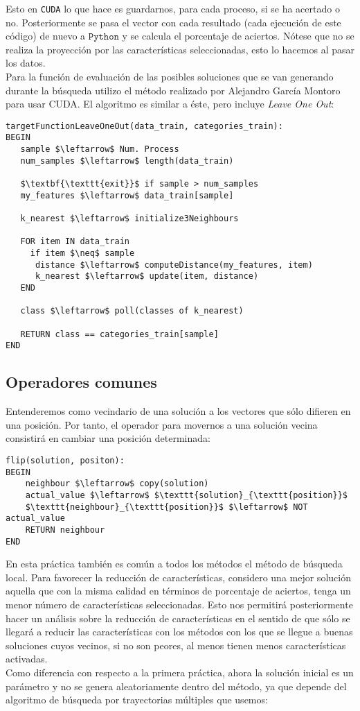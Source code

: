 \documentclass[11pt,leqno]{article}
\begin{document}
	Esto en \texttt{CUDA} lo que hace es guardarnos, para cada proceso, si se ha acertado o no. Posteriormente se pasa el vector con cada resultado (cada ejecución de este código) de nuevo a $\texttt{Python}$ y se calcula el porcentaje de aciertos. Nótese que no se realiza la proyección por las características seleccionadas, esto lo hacemos al pasar los datos.\\
	Para la función de evaluación de las posibles soluciones 	que se van generando durante la búsqueda utilizo el método realizado por Alejandro García Montoro para usar CUDA. El algoritmo es similar a éste, pero incluye \textit{Leave One Out}:

\begin{lstlisting}[mathescape=true]
targetFunctionLeaveOneOut(data_train, categories_train):
BEGIN
   sample $\leftarrow$ Num. Process
   num_samples $\leftarrow$ length(data_train)
   
   $\textbf{\texttt{exit}}$ if sample > num_samples
   my_features $\leftarrow$ data_train[sample]
   
   k_nearest $\leftarrow$ initialize3Neighbours
	
   FOR item IN data_train
     if item $\neq$ sample
      distance $\leftarrow$ computeDistance(my_features, item)
      k_nearest $\leftarrow$ update(item, distance)
   END
	
   class $\leftarrow$ poll(classes of k_nearest)
      
   RETURN class == categories_train[sample]
END
\end{lstlisting}

\subsection{Operadores comunes}
	Entenderemos como vecindario de una solución a los vectores que sólo difieren en una posición. Por tanto, el operador para movernos a una solución vecina consistirá en cambiar una posición determinada:
\begin{lstlisting}[mathescape=true]
flip(solution, positon):
BEGIN
	neighbour $\leftarrow$ copy(solution)
	actual_value $\leftarrow$ $\texttt{solution}_{\texttt{position}}$
	$\texttt{neighbour}_{\texttt{position}}$ $\leftarrow$ NOT actual_value
	RETURN neighbour
END
\end{lstlisting}
	
	
En esta práctica también es común a todos los métodos el método de búsqueda local. Para favorecer la reducción de características, considero una mejor solución aquella que con la misma calidad en términos de porcentaje de aciertos, tenga un menor número de características seleccionadas. Esto nos permitirá posteriormente hacer un análisis sobre la reducción de características en el sentido de que sólo se llegará a reducir las características con los métodos con los que se llegue a buenas soluciones cuyos vecinos, si no son peores, al menos tienen menos características activadas.\\
Como diferencia con respecto a la primera práctica, ahora la solución inicial es un parámetro y no se genera aleatoriamente dentro del método, ya que depende del algoritmo de búsqueda por trayectorias múltiples que usemos:
\end{document}
